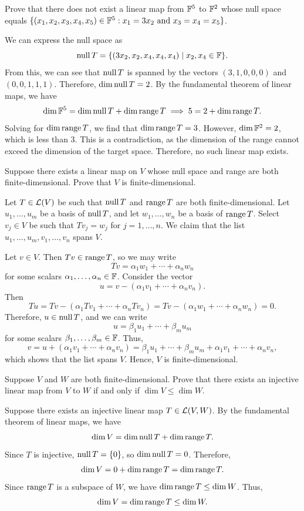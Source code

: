 \begin{exc}
\begin{exercise}
Prove that there does not exist a linear map from $\mathbb{F}^5$ to $\mathbb{F}^2$ whose null
space equals
$\{(x_1,x_2,x_3,x_4,x_5)\in\mathbb{F}^5 : x_1=3x_2 \text{ and } x_3=x_4=x_5\}$.
\end{exercise}
\begin{solution}
We can express the null space as
\[ \operatorname{null} T=\{(3x_2,x_2,x_4,x_4,x_4)\mid x_2,x_4\in\mathbb{F}\}. \]
From this, we can see that $\operatorname{null} T$ is spanned by the vectors $(3,1,0,0,0)$
and $(0,0,1,1,1)$. Therefore, $\operatorname{dim}\operatorname{null} T=2$. By the fundamental theorem of
linear maps, we have
\[ \operatorname{dim}\mathbb{F}^5=\operatorname{dim}\operatorname{null} T+\operatorname{dim}\operatorname{range} T\implies5=2+\operatorname{dim}\operatorname{range} T. \]
Solving for $\operatorname{dim}\operatorname{range} T$, we find that $\operatorname{dim}\operatorname{range} T=3$. However,
$\operatorname{dim}\mathbb{F}^2=2$, which is less than $3$. This is a contradiction, as the
dimension of the range cannot exceed the dimension of the target space.
Therefore, no such linear map exists.
\end{solution}

\begin{exercise}
Suppose there exists a linear map on $V$ whose null space and range are both
finite-dimensional. Prove that $V$ is finite-dimensional.
\end{exercise}
\begin{solution}

Let $T\in\mathcal{L}(V)$ be such that $\operatorname{null} T$ and $\operatorname{range} T$ are both
finite-dimensional. Let $u_1,\dots,u_m$ be a basis of $\operatorname{null} T$, and let
$w_1,\dots,w_n$ be a basis of $\operatorname{range} T$. Select $v_j\in V$ be such that
$Tv_j=w_j$ for $j=1,\dots,n$. We claim that the list
$u_1,\dots,u_m,v_1,\dots,v_n$ spans $V$.

Let $v\in V$. Then $Tv\in\operatorname{range} T$, so we may write
\[ Tv=\alpha_1w_1+\cdots+\alpha_nw_n \]
for some scalars $\alpha_1,\dots,\alpha_n\in\mathbb{F}$. Consider the vector
\[ u=v-(\alpha_1v_1+\cdots+\alpha_nv_n). \]
Then
\[ Tu=Tv-(\alpha_1Tv_1+\cdots+\alpha_nTv_n)=Tv-(\alpha_1w_1+\cdots+\alpha_nw_n)
   =0. \]
Therefore, $u\in\operatorname{null} T$, and we can write
\[ u=\beta_1u_1+\cdots+\beta_mu_m \]
for some scalars $\beta_1,\dots,\beta_m\in\mathbb{F}$. Thus,
\[ v=u+(\alpha_1v_1+\cdots+\alpha_nv_n)
   =\beta_1u_1+\cdots+\beta_mu_m+\alpha_1v_1+\cdots+\alpha_nv_n, \]
which shows that the list spans $V$. Hence, $V$ is finite-dimensional.
\end{solution}

\begin{exercise}
Suppose $V$ and $W$ are both finite-dimensional. Prove that there exists an
injective linear map from $V$ to $W$ if and only if $\dim V\le\dim W$.
\end{exercise}
\begin{solution}
Suppose there exists an injective linear map $T\in\mathcal{L}(V,W)$. By the
fundamental theorem of linear maps, we have
\[ \operatorname{dim} V=\operatorname{dim}\operatorname{null} T+\operatorname{dim}\operatorname{range} T. \]
Since $T$ is injective, $\operatorname{null} T=\{0\}$, so $\operatorname{dim}\operatorname{null} T=0$. Therefore,
\[ \operatorname{dim} V=0+\operatorname{dim}\operatorname{range} T=\operatorname{dim}\operatorname{range} T. \]
Since $\operatorname{range} T$ is a subspace of $W$, we have $\operatorname{dim}\operatorname{range} T\le\operatorname{dim} W$. Thus,
\[ \operatorname{dim} V=\operatorname{dim}\operatorname{range} T\le\operatorname{dim} W. \]


\end{solution}
\end{exc}

